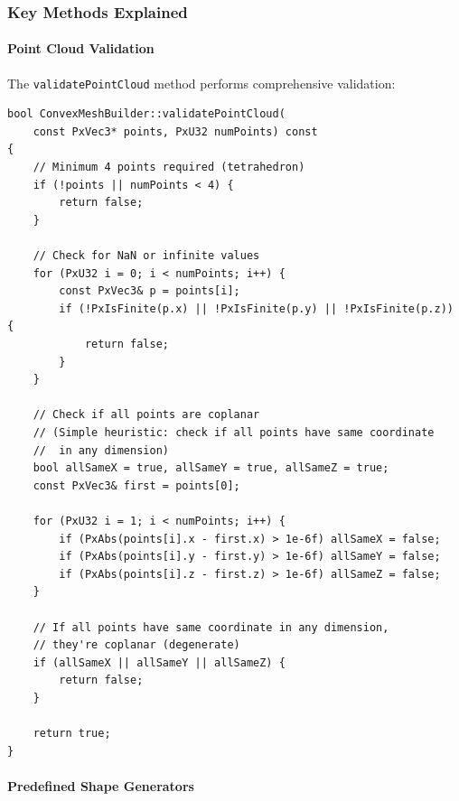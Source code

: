 \subsubsection{Key Methods Explained}

\paragraph{Point Cloud Validation}

The \texttt{validatePointCloud} method performs comprehensive validation:

\begin{lstlisting}[caption={Point cloud validation implementation}]
bool ConvexMeshBuilder::validatePointCloud(
    const PxVec3* points, PxU32 numPoints) const
{
    // Minimum 4 points required (tetrahedron)
    if (!points || numPoints < 4) {
        return false;
    }

    // Check for NaN or infinite values
    for (PxU32 i = 0; i < numPoints; i++) {
        const PxVec3& p = points[i];
        if (!PxIsFinite(p.x) || !PxIsFinite(p.y) || !PxIsFinite(p.z)) {
            return false;
        }
    }

    // Check if all points are coplanar
    // (Simple heuristic: check if all points have same coordinate
    //  in any dimension)
    bool allSameX = true, allSameY = true, allSameZ = true;
    const PxVec3& first = points[0];

    for (PxU32 i = 1; i < numPoints; i++) {
        if (PxAbs(points[i].x - first.x) > 1e-6f) allSameX = false;
        if (PxAbs(points[i].y - first.y) > 1e-6f) allSameY = false;
        if (PxAbs(points[i].z - first.z) > 1e-6f) allSameZ = false;
    }

    // If all points have same coordinate in any dimension,
    // they're coplanar (degenerate)
    if (allSameX || allSameY || allSameZ) {
        return false;
    }

    return true;
}
\end{lstlisting}

\paragraph{Predefined Shape Generators}


